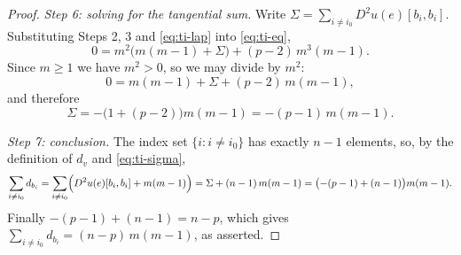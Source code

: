 \begin{proof}
\emph{Step 6: solving for the tangential sum.} Write
$\Sigma=\sum_{i\ne i_0}D^2u(e)[b_i,b_i]$. Substituting Steps 2, 3 and
\eqref{eq:ti-lap} into \eqref{eq:ti-eq},
\[
  0=m^2\bigl(m(m-1)+\Sigma\bigr)+(p-2)\,m^3(m-1).
\]
Since $m\ge1$ we have $m^2>0$, so we may divide by $m^2$:
\[
  0=m(m-1)+\Sigma+(p-2)\,m(m-1),
\]
and therefore
\begin{equation}\label{eq:ti-sigma}
  \Sigma=-\bigl(1+(p-2)\bigr)m(m-1)=-(p-1)\,m(m-1).
\end{equation}

\emph{Step 7: conclusion.} The index set $\{i:i\ne i_0\}$ has exactly $n-1$
elements, so, by the definition of $d_v$ and \eqref{eq:ti-sigma},
\[
  \sum_{i\ne i_0}d_{b_i}
  =\sum_{i\ne i_0}\Bigl(D^2u(e)[b_i,b_i]+m(m-1)\Bigr)
  =\Sigma+(n-1)\,m(m-1)
  =\bigl(-(p-1)+(n-1)\bigr)m(m-1).
\]
Finally $-(p-1)+(n-1)=n-p$, which gives
$\sum_{i\ne i_0}d_{b_i}=(n-p)\,m(m-1)$, as asserted.
\end{proof}
